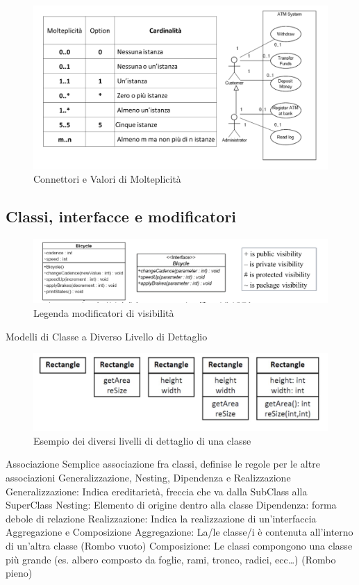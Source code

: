 \documentclass{article}
\begin{document}
	\begin{figure}[h]
		\centering
		\includegraphics[scale=0.25]{36.conn_val_molt.png}
		\caption{Connettori e Valori di Molteplicità}
		\label{fig:im-36}
	\end{figure}
	\subsection{Classi, interfacce e modificatori}
	\begin{figure}[h]
		\centering
		\includegraphics[scale=0.25]{37.mod_vis.png}
		\caption{Legenda modificatori di visibilità}
		\label{fig:im-37}
	\end{figure}
	Modelli di Classe a Diverso Livello di Dettaglio
	\begin{figure}[h]
		\centering
		\includegraphics[scale=0.25]{38.mod_class.png}
		\caption{Esempio dei diversi livelli di dettaglio di una classe}
		\label{fig:im-38}
	\end{figure}
	Associazione
	Semplice associazione fra classi, definise le regole per le altre associazioni
	Generalizzazione, Nesting, Dipendenza e Realizzazione
	Generalizzazione: Indica ereditarietà, freccia che va dalla SubClass alla SuperClass
	Nesting: Elemento di origine dentro alla classe
	Dipendenza: forma debole di relazione
	Realizzazione: Indica la realizzazione di un’interfaccia
	Aggregazione e Composizione
	Aggregazione: La/le classe/i è contenuta all’interno di un’altra classe (Rombo vuoto)
	Composizione: Le classi compongono una classe più grande (es. albero composto da foglie, rami, tronco, radici, ecc…) (Rombo pieno)
\end{document}
